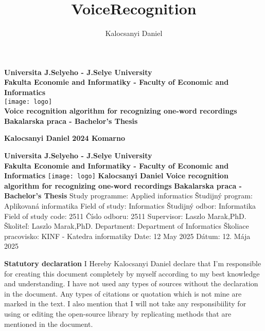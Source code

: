 \documentclass[english,12pt,oneside,a4paper]{article}
\title{VoiceRecognition}
\author{Kalocsanyi Daniel}
\begin{document}
		\textbf{Universita J.Selyeho - J.Selye University}
		\\
		\textbf{Fakulta Economie and Informatiky - Faculty of Economic and Informatics}
		\\
		\texttt{[image: logo]}
		\hspace{8cm}
		\\
		\textbf{Voice recognition algorithm for recognizing one-word recordings}
		\\
		\textbf{Bakalarska praca - Bachelor's Thesis}
	\begin{flushleft}
		\vspace{11cm}
		\textbf{Kalocsanyi Daniel 2024 Komarno}
	\end{flushleft}
	\newpage
	\textbf{Universita J.Selyeho - J.Selye University}
	\\
	\textbf{Fakulta Economie and Informatiky - Faculty of Economic and Informatics}
	\newline
	\newline
	\newline
	\newline
	\newline
	\texttt{[image: logo]}
	\newline
	\textbf{Kalocsanyi Daniel}
	\newline
	\newline
	\textbf{Voice recognition algorithm for recognizing one-word recordings}
	\newline
	\newline
	\textbf{Bakalarska praca - Bachelor's Thesis}
	\newline
	Study programme: Applied informatics
	\newline
	Študijný program: Aplikovaná informatika
	\newline
	Field of study: Informatics
	\newline
	Študijný odbor: Informatika
	\newline
	Field of study code: 2511
	\newline
    Číslo odboru: 2511 
    \newline
	Supervisor: Laszlo Marak,PhD.
	\newline
	Školiteľ: Laszlo Marak,PhD.
	\newline
	Department: Department of Informatics
	\newline
	Školiace pracovisko: KINF - Katedra informatiky
	\newline
	Date: 12 May 2025
	\newline
	Dátum: 12. Mája 2025
	\newpage
	
	\newpage
	\textbf{Statutory declaration}
	\newline
	\newline
	I Hereby Kalocsanyi Daniel declare that I'm responsible for creating this document completely by myself according to my best knowledge and understanding. I have not used any types of sources without the declaration in the document. Any types of citations or quotation which is not mine are marked in the text. I also mention that I will not take any responsibiility for using or editing the open-source library by replicating methods that are mentioned in the document.
	\newpage
	\newpage
\end{document}
